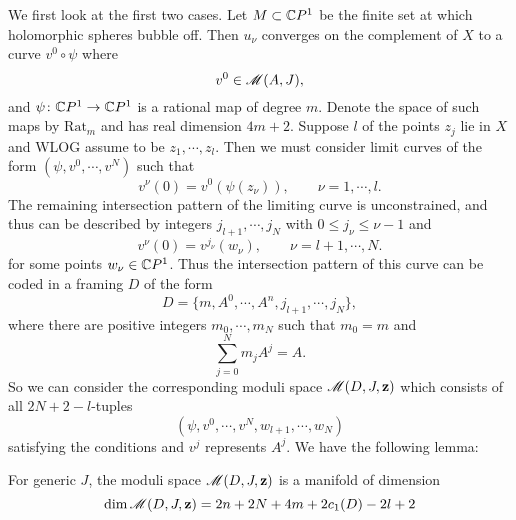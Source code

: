 \documentclass[twoside]{article}
\begin{document}
We first look at the first two cases. Let $M\subset\mathbb{C}P^{1}$ be the finite set 
at which holomorphic spheres bubble off. 
Then $u_\nu$ converges on the complement of $X$ to a curve $v^0\circ \psi$ where
\[v^0\in\mathscr{M}(A,J),\]
and $\psi\colon \mathbb{C}P^{1}\rightarrow \mathbb{C}P^{1}$ is a rational map of degree $m$. 
Denote the space of such maps by $\mathrm{Rat}_m$ and has real dimension $4m+2$. 
Suppose $l$ of the points $z_j$ lie in $X$ and WLOG assume to be $z_1,\cdots,z_l$. 
Then we must consider limit curves of the form $(\psi,v^0,\cdots,v^N)$ such that
\[v^\nu(0)=v^0(\psi(z_\nu)),\qquad \nu=1,\cdots,l.\]
The remaining intersection pattern of the limiting curve is unconstrained, and thus can be described by integers
$j_{l+1},\cdots,j_N$ with $0\leq j_\nu\leq \nu-1$ and
\[v^\nu(0)=v^{j_\nu}(w_\nu),\qquad \nu=l+1,\cdots,N.\]
for some points $w_\nu\in\mathbb{C}P^{1}$. 
Thus the intersection pattern of this curve can be coded in a framing $D$ of the form
\[D=\{m,A^0,\cdots,A^n,j_{l+1},\cdots,j_N\},\]
where there are positive integers $m_0,\cdots,m_N$ such that $m_0=m$ and
\[\sum_{j=0}^{N}m_jA^j=A.\]
So we can consider the corresponding moduli space $\mathscr{M}(D,J,\mathbf{z})$ 
which consists of all $2N+2-l$-tuples
\[(\psi,v^0,\cdots,v^N,w_{l+1},\cdots,w_{N})\]
satisfying the conditions and $v^j$ represents $A^j$. We have the following lemma:

\begin{lemma} \label{lem-2-2}
    For generic $J$, the moduli space $\mathscr{M}(D,J,\mathbf{z})$ is a manifold of dimension
    \[\dim\mathscr{M}(D,J,\mathbf{z})=2n+2N+4m+2c_1(D)-2l+2\]
\end{lemma}
\end{document}
